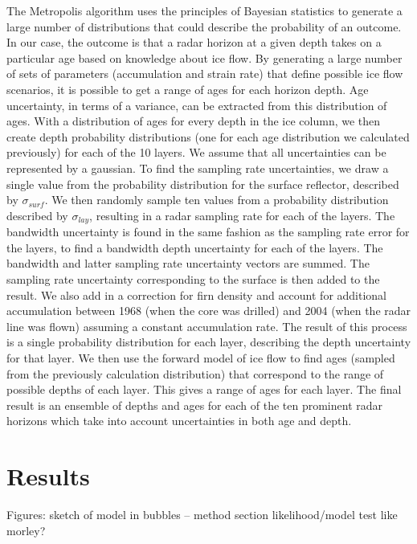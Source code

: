 \documentclass[jgrga]{agutex}
\begin{document}
\begin{article}
	The Metropolis algorithm uses the principles of Bayesian statistics to generate a large number of distributions that could describe the probability of an outcome. In our case, the outcome is that a radar horizon at a given depth takes on a particular age based on knowledge about ice flow. By generating a large number of sets of parameters (accumulation and strain rate) that define possible ice flow scenarios, it is possible to get a range of ages for each horizon depth. Age uncertainty, in terms of a variance, can be extracted from this distribution of ages.
	With a distribution of ages for every depth in the ice column, we then create depth probability distributions (one for each age distribution we calculated previously) for each of the 10 layers. We assume that all uncertainties can be represented by a gaussian. To find the sampling rate uncertainties, we draw a single value from the probability distribution for the surface reflector, described by $\sigma_{surf}$. We then randomly sample ten values from a probability distribution described by $\sigma_{lay}$, resulting in a radar sampling rate for each of the layers. The bandwidth uncertainty is found in the same fashion as the sampling rate error for the layers, to find a bandwidth depth uncertainty for each of the layers. The bandwidth and latter sampling rate uncertainty vectors are summed.  The sampling rate uncertainty corresponding to the surface is then added to the result. We also add in a correction for firn density and account for additional accumulation between 1968 (when the core was drilled) and 2004 (when the radar line was flown) assuming a constant accumulation rate.
	The result of this process is a single probability distribution for each layer, describing the depth uncertainty for that layer. We then use the forward model of ice flow to find ages (sampled from the previously calculation distribution) that correspond to the range of possible depths of each layer. This gives a range of ages for each layer. The final result is an ensemble of depths and ages for each of the ten prominent radar horizons which take into account uncertainties in both age and depth.






\section{Results}
Figures:
sketch of model in bubbles -- method section
likelihood/model test like morley?


\end{article}
\end{document}
